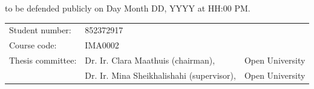 \begin{titlepage}
\begin{center}
        to be defended publicly on Day Month DD, YYYY at HH:00 PM.

        \vfill

        \begin{tabular}{lll}
            Student number: & 852372917                                                   \\
            Course code:    & IMA0002                                                     \\
            Thesis committee:
                            & Dr. Ir. Clara Maathuis (chairman),        & Open University \\
                            & Dr. Ir. Mina Sheikhalishahi (supervisor), & Open University
        \end{tabular}

        \bigskip


        \bigskip

    \end{center}

\end{titlepage}
